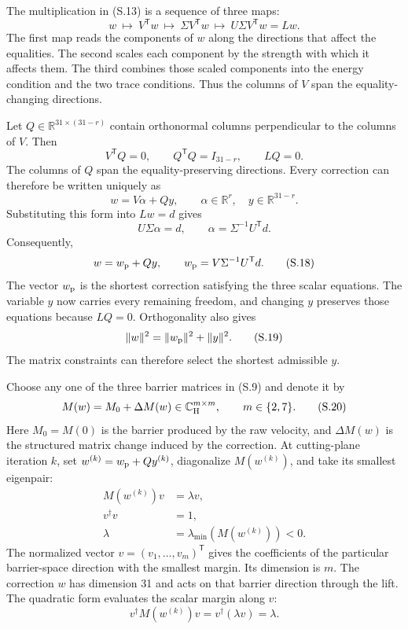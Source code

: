 \documentclass[10pt,letterpaper,twocolumn]{article}
\newcommand{\R}{\mathbb R}
\newcommand{\C}{\mathbb C}
\begin{document}
The multiplication in (S.13) is a sequence of three maps:
\[
w
\ \longmapsto\ V^{\mathsf T}w
\ \longmapsto\ \Sigma V^{\mathsf T}w
\ \longmapsto\ U\Sigma V^{\mathsf T}w=Lw.
\tag{S.14}
\]
The first map reads the components of \(w\) along the directions that affect
the equalities.  The second scales each component by the strength with which
it affects them.  The third combines those scaled components into the energy
condition and the two trace conditions.  Thus the columns of \(V\) span the
equality-changing directions.

Let \(Q\in\R^{31\times(31-r)}\) contain orthonormal columns perpendicular to
the columns of \(V\).  Then
\[
V^{\mathsf T}Q=0,
\qquad Q^{\mathsf T}Q=I_{31-r},
\qquad LQ=0.
\tag{S.15}
\]
The columns of \(Q\) span the equality-preserving directions.  Every
correction can therefore be written uniquely as
\[
w=V\alpha+Qy,
\qquad
\alpha\in\R^r,
\quad y\in\R^{31-r}.
\tag{S.16}
\]
Substituting this form into \(Lw=d\) gives
\[
U\Sigma\alpha=d,
\qquad
\alpha=\Sigma^{-1}U^{\mathsf T}d.
\tag{S.17}
\]
Consequently,
\[
w=w_{\rm p}+Qy,
\qquad
w_{\rm p}=V\Sigma^{-1}U^{\mathsf T}d.
\tag{S.18}
\]
The vector \(w_{\rm p}\) is the shortest correction satisfying the three
scalar equations.  The variable \(y\) now carries every remaining freedom,
and changing \(y\) preserves those equations because \(LQ=0\).  Orthogonality
also gives
\[
\|w\|^2=\|w_{\rm p}\|^2+\|y\|^2.
\tag{S.19}
\]
The matrix constraints can therefore select the shortest admissible \(y\).

Choose any one of the three barrier matrices in (S.9) and denote it by
\[
M(w)=M_0+\Delta M(w)\in\C_{\rm H}^{m\times m},
\qquad m\in\{2,7\}.
\tag{S.20}
\]
Here \(M_0=M(0)\) is the barrier produced by the raw velocity, and
\(\Delta M(w)\) is the structured matrix change induced by the correction.
At cutting-plane iteration \(k\), set
\(w^{(k)}=w_{\rm p}+Qy^{(k)}\), diagonalize \(M(w^{(k)})\), and take its
smallest eigenpair:
\[
\begin{aligned}
M(w^{(k)})v&=\lambda v,\\
v^\dagger v&=1,\\
\lambda&=\lambda_{\min}(M(w^{(k)}))<0.
\end{aligned}
\tag{S.21}
\]
The normalized vector \(v=(v_1,\ldots,v_m)^{\mathsf T}\) gives the
coefficients of the particular barrier-space direction with the smallest
margin.  Its dimension is \(m\).  The correction \(w\) has dimension 31 and
acts on that barrier direction through the lift.  The quadratic form evaluates
the scalar margin along \(v\):
\[
v^\dagger M(w^{(k)})v
=v^\dagger(\lambda v)
=\lambda.
\tag{S.22}
\]
\end{document}
